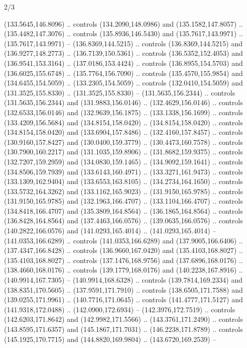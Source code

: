 \begin{flagdescription}{2/3}
\begin{scope}[xshift=0.5\flaglength,yshift=0.5\flagwidth,scale=\flagwidth/180]
\begin{scope}[y=0.8pt, x=0.8pt, yscale=-1,shift={(-168.75,-108.75)}]
  (133.5645,146.8096) .. controls (134.2090,148.0986) and (135.1582,147.8057) ..
  (135.4482,147.3076) .. controls (135.8936,146.5430) and (135.7617,143.9971) ..
  (135.7617,143.9971) -- (136.8369,144.5215) .. controls (136.8369,144.5215) and
  (136.9277,148.2773) .. (136.7139,150.5361) .. controls (136.5352,152.4053) and
  (136.9541,153.3164) .. (137.0186,153.4424) .. controls (136.8955,154.5703) and
  (136.6025,155.6748) .. (135.7764,156.7090) .. controls (135.4570,155.9854) and
  (134.6455,154.5059) .. (133.2305,154.5059) .. controls (132.0410,154.5059) and
  (131.3525,155.8330) .. (131.3525,155.8330) -- (131.5635,156.2344) .. controls
  (131.5635,156.2344) and (131.9883,156.0146) .. (132.4629,156.0146) .. controls
  (132.6533,156.0146) and (132.9639,156.1875) .. (133.1338,156.1699) .. controls
  (133.4209,156.5684) and (134.8154,158.0420) .. (134.8154,158.0420) .. controls
  (134.8154,158.0420) and (133.6904,157.8486) .. (132.4160,157.8457) .. controls
  (130.9160,157.8427) and (130.0400,159.3779) .. (130.4473,160.7578) .. controls
  (130.7900,160.2217) and (131.1035,159.8906) .. (131.8682,159.9375) .. controls
  (132.7207,159.2959) and (134.0830,159.1465) .. (134.9092,159.1641) .. controls
  (134.8506,159.7939) and (133.6143,160.4971) .. (133.3271,161.9473) .. controls
  (133.1309,162.9404) and (133.6553,163.8105) .. (134.2734,164.1650) .. controls
  (133.5732,164.3262) and (133.1162,165.9023) .. (131.9150,165.9785) .. controls
  (131.9150,165.9785) and (132.1963,166.4707) .. (133.1104,166.4707) .. controls
  (134.8418,166.4707) and (135.3809,164.8564) .. (136.1865,164.8564) .. controls
  (136.8428,164.8564) and (137.4463,166.0576) .. (139.0635,166.0576) .. controls
  (140.2822,166.0576) and (141.0293,165.4014) .. (141.0293,165.4014) --
  (141.0353,166.6289) .. controls (141.0353,166.6289) and (137.9005,166.6406) ..
  (137.4347,166.8428) .. controls (136.9660,167.0420) and (135.4103,168.8027) ..
  (135.4103,168.8027) .. controls (137.1476,168.9756) and (137.6896,168.0176) ..
  (138.4660,168.0176) .. controls (139.1779,168.0176) and (140.2238,167.8916) ..
  (140.9914,167.7305) -- (140.9914,168.6328) .. controls (139.7814,169.2334) and
  (138.8351,170.5605) .. (137.9591,171.7910) .. controls (138.6505,171.7588) and
  (139.0255,171.9961) .. (140.7716,171.0645) .. controls (141.4777,171.5127) and
  (141.9318,172.0488) .. (142.0900,172.6934) -- (142.3976,172.7519) .. controls
  (142.6203,171.8642) and (142.9982,171.5566) .. (143.3761,171.2490) .. controls
  (143.8595,171.6357) and (145.1867,171.7031) .. (146.2238,171.8789) .. controls
  (145.1925,170.7715) and (144.8820,169.9804) .. (143.6720,169.2539) --

\end{scope}
\end{scope}
\end{flagdescription}
